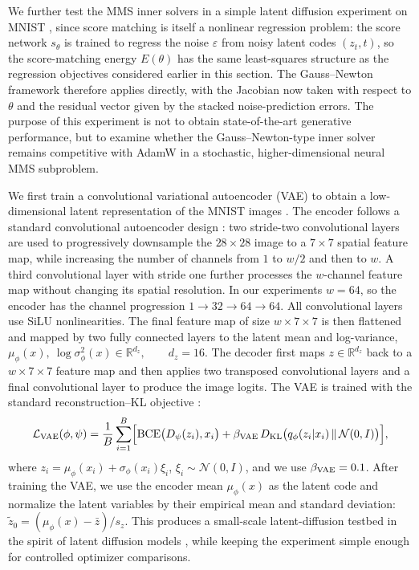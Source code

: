 \documentclass[twoside,11pt]{article}
\begin{document}
We further test the MMS inner solvers in a simple latent diffusion \citep{rombach2022high} experiment
on MNIST \citep{lecun1998gradient}, since score matching is itself a nonlinear regression problem: the score network $s_\theta$ is trained to regress the noise $\varepsilon$ from noisy latent codes $(z_t, t)$, so the score-matching energy $E(\theta)$ has the same least-squares structure as the regression objectives considered earlier in this section. The Gauss--Newton framework therefore applies directly, with the Jacobian now taken with respect to $\theta$ and the residual vector given by the stacked noise-prediction errors. The purpose of this experiment is not to obtain state-of-the-art
generative performance, but to examine whether the Gauss--Newton-type inner
solver remains competitive with AdamW in a stochastic, higher-dimensional
neural MMS subproblem. 

We first train a convolutional variational autoencoder (VAE) to obtain a
low-dimensional latent representation of the MNIST images \citep{kingma2013auto}.  The encoder follows a standard convolutional autoencoder design \citep{radford2016unsupervised}: two
stride-two convolutional layers are used to progressively downsample the
\(28\times 28\) image to a \(7\times 7\) spatial feature map, while increasing
the number of channels from \(1\) to \(w/2\) and then to \(w\). A third
convolutional layer with stride one further processes the \(w\)-channel feature
map without changing its spatial resolution. In our experiments \(w=64\), so
the encoder has the channel progression
\(
    1 \longrightarrow 32 \longrightarrow 64 \longrightarrow 64 .
\)
All convolutional layers use SiLU nonlinearities. The final feature map of size
\(w\times 7\times 7\) is then flattened and mapped by two fully connected layers
to the latent mean and log-variance,
\(
    \mu_\phi(x),\ \log\sigma_\phi^2(x)\in\mathbb R^{d_z},
    \qquad d_z=16.
\)
The decoder first maps \(z\in\mathbb R^{d_z}\) back to a \(w\times 7\times 7\)
feature map and then applies two transposed convolutional layers and a final
convolutional layer to produce the image logits. The VAE is trained with the
standard reconstruction--KL objective \citep{kingma2013auto}:
\[
    \mathcal L_{\rm VAE}(\phi,\psi)
    =
    \frac{1}{B}\sum_{i=1}^B
    \Bigl[
    {\rm BCE}\bigl(D_\psi(z_i),x_i\bigr)
    +
    \beta_{\rm VAE}\,
    D_{\rm KL}
    \bigl(q_\phi(z_i|x_i)\,\|\,\mathcal N(0,I)\bigr)
    \Bigr],
\]
where \(z_i=\mu_\phi(x_i)+\sigma_\phi(x_i)\xi_i\), \(\xi_i\sim\mathcal N(0,I)\),
and we use \(\beta_{\rm VAE}=0.1\). After training the VAE, we use the encoder
mean \(\mu_\phi(x)\) as the latent code and normalize the latent variables by
their empirical mean and standard deviation:
\( \tilde z_0   = (\mu_\phi(x)-\bar z)/s_z. \)
This produces a small-scale latent-diffusion testbed in the spirit of latent
diffusion models \citep{rombach2022high}, while keeping the experiment simple
enough for controlled optimizer comparisons.
\end{document}
